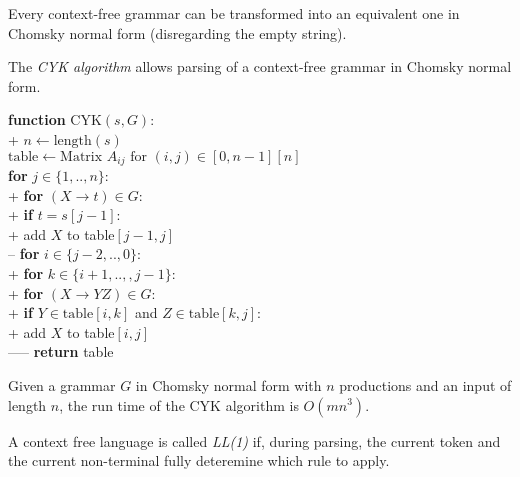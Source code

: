 \documentclass{article}
\begin{document}
\begin{lemma}
	Every context-free grammar can be transformed into an
	equivalent one in Chomsky normal form (disregarding
	the empty string).
\end{lemma}

\begin{definition}
	The \emph{CYK algorithm} allows parsing of a context-free
	grammar in Chomsky normal form.
	\begin{pseudo}
		\textbf{function} \textsf{CYK}$(s,G)$:\\+
			$n\leftarrow\text{length}(s)$\\
			$\text{table}\leftarrow\text{Matrix }A_{ij}\text{ for }(i,j)\in[0,n-1][n]$\\
			\textbf{for} $j\in\{1,..,n\}$:\\+
				\textbf{for} $(X\to t)\in G$:\\+
					\textbf{if} $t=s[j-1]$:\\+
						add $X$ to table$[j-1,j]$\\--
				\textbf{for} $i\in\{j-2,..,0\}$:\\+
					\textbf{for} $k\in\{i+1,..,,j-1\}$:\\+
						\textbf{for} $(X\to YZ)\in G$:\\+
							\textbf{if} $Y\in\text{table}[i,k]$ and $Z\in\text{table}[k,j]$:\\+
								add $X$ to table$[i,j]$\\-----
            \textbf{return} table
    \end{pseudo}
\end{definition}

\begin{theorem}
	Given a grammar $G$ in Chomsky normal form with $n$ 
	productions and an input of length $n$, the run time
	of the CYK algorithm is $O(mn^3)$.
\end{theorem}

\begin{definition}[L22]
	A context free language is called \emph{LL(1)} if, during
	parsing, the current token and the current non-terminal fully
	deteremine which rule to apply.	
\end{definition}
\end{document}
